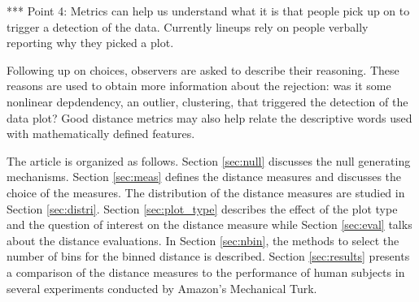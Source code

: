 \documentclass[12]{article}
\begin{document}
{\color{red} *** Point 4: Metrics can help us understand what it is that people pick up on to trigger a detection of the data. Currently lineups rely on people verbally reporting why they picked a plot. }

Following up on choices, observers are asked to describe their reasoning. These reasons are used to obtain more information about the rejection: was it some nonlinear depdendency, an outlier, clustering, that triggered the detection of the data plot? Good distance metrics may also help relate the descriptive words used with mathematically defined features. 

The article is organized as follows. Section \ref{sec:null} discusses the null generating mechanisms. Section \ref{sec:meas} defines the distance measures and discusses the choice of the measures. The distribution of the distance measures are studied in Section \ref{sec:distri}. Section \ref{sec:plot_type} describes the effect of the plot type and the question of interest on the distance measure while Section \ref{sec:eval} talks about the distance evaluations. In Section \ref{sec:nbin}, the methods to select the number of bins for the binned distance is described. Section \ref{sec:results} presents a comparison of the distance measures to the performance of human subjects in several experiments conducted by Amazon's Mechanical Turk.




\end{document}
